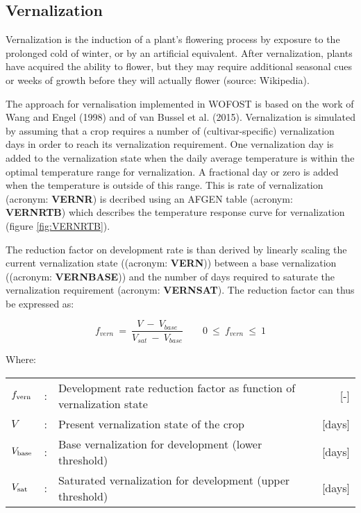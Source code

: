 \subsection{Vernalization}

Vernalization is the induction of a plant's flowering process by exposure to the prolonged cold of winter, 
or by an artificial equivalent. After vernalization, plants have acquired the ability to flower, but they may 
require additional seasonal cues or weeks of growth before they will actually flower (source: Wikipedia). 

The approach for vernalisation implemented in WOFOST is based on the work of Wang and Engel (1998) and of 
van Bussel et al. (2015). 
Vernalization is simulated by assuming that a crop requires a number of (cultivar-specific)
vernalization days in order to reach its vernalization requirement. One vernalization day is added to the 
vernalization state 
when the daily average temperature is within the optimal temperature range for vernalization. A fractional
day or zero  is added when the temperature is outside of this range. This is rate of vernalization
(acronym: {\bf VERNR}) is decribed using an AFGEN table (acronym:  {\bf VERNRTB}) which describes the
temperature response curve for vernalization (figure \ref{fig:VERNRTB}).

The reduction factor on development rate is than derived by linearly scaling the current vernalization state 
((acronym:  {\bf VERN}))  between a base vernalization ((acronym:  {\bf VERNBASE})) and the number of 
days required to saturate the vernalization requirement (acronym:  {\bf VERNSAT}). The reduction 
factor can thus be expressed as: 

\begin{equation}
\label{eq:vern_factor}
f_{vern} ~=~{\frac{V ~-~V_{base} }{V _{sat} ~-~ V_{base} }} ~~~~~~~~~0~\le ~f _{vern} ~\le ~1
\end{equation}

Where:\\[5pt]
\begin{tabularx}{\textwidth}{llXr}
	$f_{{\rm vern}}$ &:& Development rate reduction factor as function of vernalization state   &     [-]\\
	$V$ &:& Present vernalization state of the crop   &     [days]\\
	$V_{{\rm base}}$ &:& Base vernalization for development (lower threshold)    &    [days]\\
	$V_{{\rm sat}}$ &:& Saturated vernalization for development (upper threshold)    &    [days]\\
\end{tabularx}

